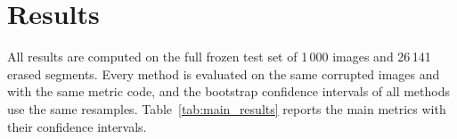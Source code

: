 \documentclass[preprint,12pt]{elsarticle}
\begin{document}
\section{Results}
\label{sec:results}

All results are computed on the full frozen test set of 1\,000 images and 26\,141
erased segments. Every method is evaluated on the same corrupted images and with the
same metric code, and the bootstrap confidence intervals of all methods use the same
resamples. Table~\ref{tab:main_results} reports the main metrics with their
confidence intervals.

\begin{table}
\centering
\caption{Line restoration on the held-out test set (1\,000 images, 26\,141 erased
segments). Values are percentages unless noted; $\pm$ is half the width of the 95\%
bootstrap confidence interval. $\tau$: pixel tolerance. Bucket acc.: ground-truth
regions recovered with IoU$\geq$0.9. Leak: one output region spanning two
ground-truth regions. $\uparrow$: higher is better; $\downarrow$: lower is better;
$\to 1$: closest to 1 is best. Best value per column in bold.}
\label{tab:main_results}
\small
{}
\end{table}
\end{document}
